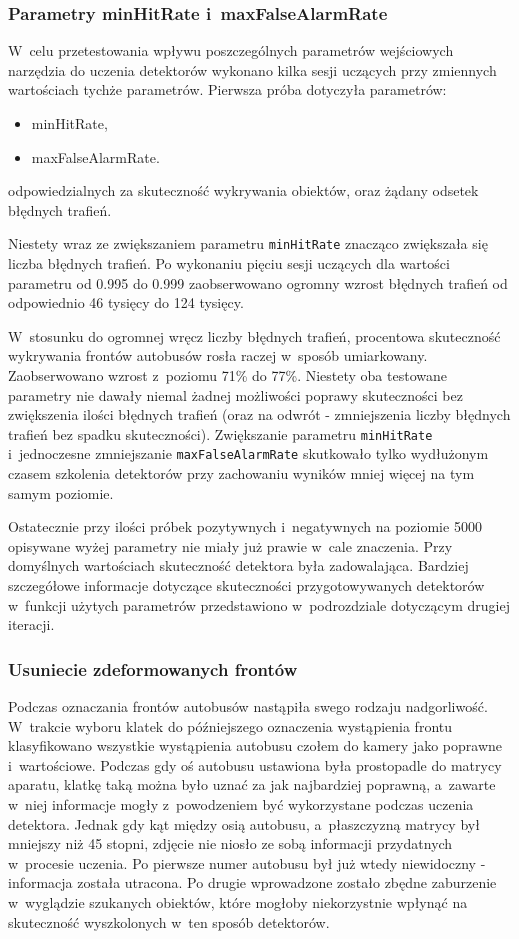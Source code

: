 \subsubsection{Parametry minHitRate i~maxFalseAlarmRate}

W~celu przetestowania wpływu poszczególnych parametrów wejściowych
narzędzia do uczenia detektorów wykonano kilka sesji uczących 
przy zmiennych wartościach tychże parametrów. Pierwsza próba dotyczyła
parametrów:
\begin{itemize}
    \item minHitRate,
    \item maxFalseAlarmRate.
\end{itemize}
odpowiedzialnych za skuteczność wykrywania obiektów,
oraz żądany odsetek błędnych trafień.

Niestety wraz ze zwiększaniem parametru \verb|minHitRate|
znacząco zwiększała
się liczba błędnych trafień. Po wykonaniu pięciu sesji
uczących dla wartości parametru od 0.995 do 0.999 zaobserwowano 
ogromny wzrost błędnych trafień od odpowiednio 46 tysięcy
do 124 tysięcy.


W~stosunku do ogromnej wręcz liczby błędnych trafień, procentowa skuteczność
wykrywania frontów autobusów rosła raczej w~sposób umiarkowany.
Zaobserwowano wzrost z~poziomu 71\% do 77\%. 
Niestety oba testowane parametry nie dawały niemal żadnej
możliwości poprawy skuteczności bez zwiększenia ilości błędnych
trafień (oraz na odwrót - zmniejszenia liczby
błędnych trafień bez spadku skuteczności).
Zwiększanie parametru \verb|minHitRate| i~jednoczesne zmniejszanie
\verb|maxFalseAlarmRate| skutkowało tylko wydłużonym czasem
szkolenia detektorów przy zachowaniu wyników mniej więcej na
tym samym poziomie.

Ostatecznie przy ilości próbek pozytywnych i~negatywnych 
na poziomie 5000 opisywane wyżej parametry nie miały już prawie w~cale
znaczenia. Przy domyślnych wartościach skuteczność detektora była 
zadowalająca. Bardziej szczegółowe informacje dotyczące skuteczności
przygotowywanych detektorów w~funkcji użytych parametrów
przedstawiono w~podrozdziale dotyczącym drugiej iteracji.

\subsubsection{Usuniecie zdeformowanych frontów}

Podczas oznaczania frontów autobusów nastąpiła swego rodzaju
nadgorliwość. W~trakcie wyboru klatek do późniejszego oznaczenia
wystąpienia frontu klasyfikowano wszystkie wystąpienia autobusu
czołem do kamery jako poprawne i~wartościowe. Podczas gdy oś autobusu
ustawiona była prostopadle do matrycy aparatu, klatkę taką można było
uznać za jak najbardziej poprawną, a~zawarte w~niej informacje mogły
z~powodzeniem być wykorzystane podczas uczenia detektora. Jednak
gdy kąt między osią autobusu, a~płaszczyzną matrycy był mniejszy
niż 45 stopni, zdjęcie nie niosło ze sobą informacji przydatnych
w~procesie uczenia. Po pierwsze numer autobusu był już wtedy
niewidoczny - informacja została utracona. Po drugie wprowadzone
zostało zbędne zaburzenie w~wyglądzie szukanych obiektów,
które mogłoby niekorzystnie wpłynąć na skuteczność wyszkolonych
w~ten sposób detektorów.

